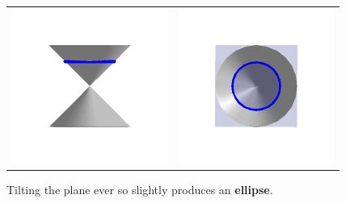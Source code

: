 \documentclass[nooutcomes]{ximera}
\begin{document}
\begin{center}

\begin{tabular}{cc}

\includegraphics[width=2in]{./ConicsGraphics/Circle01.jpg} & \includegraphics[width=2in]{./ConicsGraphics/Circle02.jpg} \\

\end{tabular}

\end{center}

\pagebreak

Tilting the plane ever so slightly produces an  \textbf{ellipse}.
\end{document}
